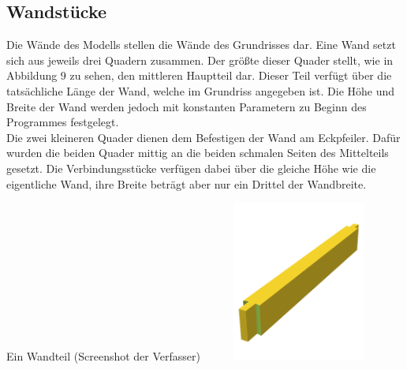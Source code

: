 \subsection{Wandstücke}
Die Wände des Modells stellen die Wände des Grundrisses dar.
Eine Wand setzt sich aus jeweils drei Quadern zusammen. 
Der größte dieser Quader stellt, wie in Abbildung 9 zu sehen, den mittleren Hauptteil dar.
Dieser Teil verfügt über die tatsächliche Länge der Wand, welche im Grundriss angegeben ist.
Die Höhe und Breite der Wand werden jedoch mit konstanten Parametern zu Beginn des Programmes festgelegt. \\
Die zwei kleineren Quader dienen dem Befestigen der Wand am Eckpfeiler.
Dafür wurden die beiden Quader mittig an die beiden schmalen Seiten des Mittelteils gesetzt.
Die Verbindungsstücke verfügen dabei über die gleiche Höhe wie die eigentliche Wand, ihre Breite beträgt aber nur ein Drittel der Wandbreite.\\
\begin{Bild}{Ein Wandteil (Screenshot der Verfasser)}
	\includegraphics[height=200px, width=240px]{Bilder/Untereinheit_Wand}
\end{Bild}

